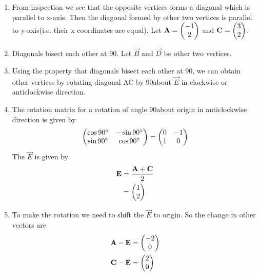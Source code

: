 \begin{enumerate}
\item From inspection we see that the opposite vertices forms a diagonal which is parallel to x-axis. Then the diagonal formed by other two vertices is parallel to y-axis(i.e. their x coordinates are equal). Let $\mathbf{A}= \begin{pmatrix}-1\\2\end{pmatrix}$  and $\mathbf{C}=\begin{pmatrix}3\\2\end{pmatrix}$. 

\item Diagonals bisect each other at 90\degree.
Let $\vec{B}$ and $\vec{D}$ be other two vertices. 
\item Using the property that diagonals bisect each other at 90\degree, we can obtain other vertices by rotating diagonal AC by 90\degree about $\vec{E}$ in clockwise or anticlockwise direction.

\item The rotation matrix for a rotation of angle 90\degree about origin in anticlockwise direction is given by
\begin{align}
\begin{pmatrix}\cos90\degree&-\sin90\degree\\\sin90\degree&\cos90\degree\end{pmatrix}=\begin{pmatrix}0&-1\\1&0\end{pmatrix}
\end{align}
The $\vec{E}$ is given by
\begin{align}
\mathbf{E}&= \frac{\mathbf{A}+\mathbf{C}}{2} \\
&= \begin{pmatrix}1\\2\end{pmatrix}
\end{align}

\item To make the rotation we need to shift the $\vec{E}$ to origin. So the change in other vectors are
\begin{align}
\mathbf{A}-\mathbf{E}&=\begin{pmatrix}-2\\0\end{pmatrix}\\
\mathbf{C}-\mathbf{E}&=\begin{pmatrix}2\\0\end{pmatrix}
\end{align}


\end{enumerate}
